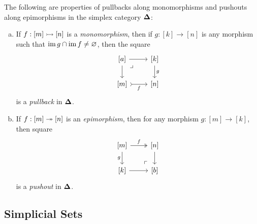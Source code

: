 \begin{lemma}
\label{lem:}
The following are properties of pullbacks along monomorphisms and pushouts along
epimorphisms in the simplex category \({\mathbf{\Delta}}\):
\begin{enumerate}[(a)]\setlength\itemsep{0em}
\item If \(f: [m] \rightarrowtail [n]\) is a \emph{monomorphism}, then if \(g: [k] \to
  [n]\) is any morphism such that \(\operatorname{im} g \cap \operatorname{im} f \neq \varnothing\), then the
  square
  \[
  \begin{tikzcd}
  {[a]}  \ar[r] \ar[d] \ar[rd, phantom, very near start, "\lrcorner"]
  &{[k]} \ar[d, "g"] \\
  {[m]} \ar[r, tail, "f"'] &{[n]}
  \end{tikzcd}
  \]
  is a \emph{pullback} in \({\mathbf{\Delta}}\).
\item If \(f: [m] \twoheadrightarrow [n]\) is an \emph{epimorphism}, then for any morphism
  \(g: [m] \to [k]\), then square
  \[
  \begin{tikzcd}
  {[m]} \ar[r, two heads, "f"] \ar[d, "g"']
  \ar[dr, very near end, phantom, "\ulcorner"]
  &{[n]} \ar[d] \\
  {[k]} \ar[r] &{[b]}
  \end{tikzcd}
  \]
  is a \emph{pushout} in \({\mathbf{\Delta}}\).
\end{enumerate}
\end{lemma}



\subsection{Simplicial Sets}

